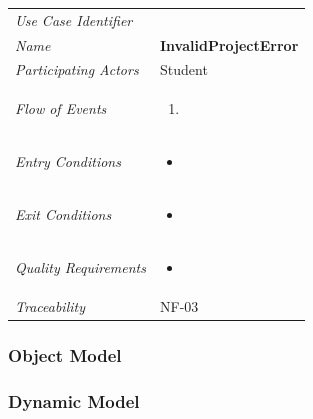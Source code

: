 \documentclass[12pt,letterpaper]{article}
\begin{document}
\begin{center}
	\begin{tabu} to 
		\toprule
		Use Case Identifier & \invalidprojecterror{} \\
		Name & {\bf InvalidProjectError} \\
		Participating Actors & Student \\
		Flow of Events & 
	    \begin{enumerate}[topsep=-1em, leftmargin=*]
		    \item 
		\end{enumerate} \\

		Entry Conditions &
		\begin{itemize}[topsep=-1em, leftmargin=*]
		    \item 
        \end{itemize} \\

		Exit Conditions &
		\begin{itemize}[topsep=-1em, leftmargin=*]
		    \item 
        \end{itemize} \\

		Quality Requirements &
		\begin{itemize}[topsep=-1em, leftmargin=*]
		    \item 
        \end{itemize} \\

		Traceability & NF-03 \\
		\toprule
	\end{tabu}
\end{center}

\subsubsection{Object Model}


\subsubsection{Dynamic Model}
\end{document}
